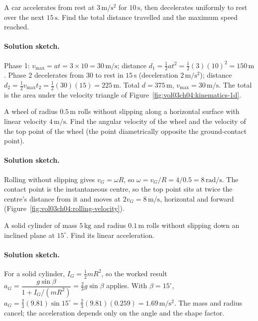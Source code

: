 \begin{exercise}
A car accelerates from rest at $3\,\si{\meter\per\second\squared}$ for
$10\,\si{\second}$, then decelerates uniformly to rest over the next
$15\,\si{\second}$. Find the total distance travelled and the maximum
speed reached.
\paragraph{Solution sketch.} Phase 1: $v_{\max}=at=3\times 10=
30\,\si{\meter\per\second}$; distance $d_{1}=\tfrac{1}{2}at^{2}=
\tfrac{1}{2}(3)(10)^{2}=150\,\si{\meter}$. Phase 2 decelerates from
$30$ to rest in $15\,\si{\second}$ (deceleration $2\,\si{\meter\per
\second\squared}$); distance $d_{2}=\tfrac{1}{2}v_{\max}t_{2}=
\tfrac{1}{2}(30)(15)=225\,\si{\meter}$. Total $d=375\,\si{\meter}$,
$v_{\max}=30\,\si{\meter\per\second}$. The total is the area under the
velocity triangle of
Figure~\ref{fig:vol03ch04:kinematics-1d}.
\end{exercise}

\begin{exercise}
A wheel of radius $0.5\,\si{\meter}$ rolls without slipping along a
horizontal surface with linear velocity $4\,\si{\meter\per\second}$.
Find the angular velocity of the wheel and the velocity of the top
point of the wheel (the point diametrically opposite the
ground-contact point).
\paragraph{Solution sketch.} Rolling without slipping gives
$v_{G}=\omega R$, so $\omega=v_{G}/R=4/0.5=8\,\si{\radian\per
\second}$. The contact point is the instantaneous centre, so the top
point sits at twice the centre's distance from it and moves at
$2v_{G}=8\,\si{\meter\per\second}$, horizontal and forward
(Figure~\ref{fig:vol03ch04:rolling-velocity}).
\end{exercise}

\begin{exercise}
A solid cylinder of mass $5\,\si{\kilogram}$ and radius $0.1\,\si{
\meter}$ rolls without slipping down an inclined plane at
$15^{\circ}$. Find its linear acceleration.
\paragraph{Solution sketch.} For a solid cylinder, $I_{G}=\tfrac{1}{2}
mR^{2}$, so the worked result $a_{G}=\dfrac{g\sin\beta}{1+I_{G}/
(mR^{2})}=\tfrac{2}{3}g\sin\beta$ applies. With $\beta=15^{\circ}$,
$a_{G}=\tfrac{2}{3}(9.81)\sin 15^{\circ}=\tfrac{2}{3}(9.81)(0.259)=
1.69\,\si{\meter\per\second\squared}$. The mass and radius cancel; the
acceleration depends only on the angle and the shape factor.
\end{exercise}

